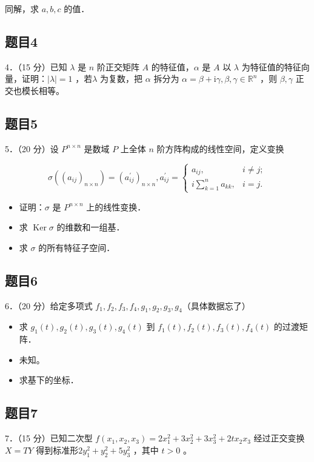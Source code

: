 \documentclass{article}
\begin{document}
同解，求 \(a, b, c\) 的值．

\subsection{题目4}
4．（15 分）已知 \(\lambda\) 是 \(n\) 阶正交矩阵 \(A\) 的特征值，\(\alpha\) 是 \(A\) 以 \(\lambda\) 为特征值的特征向量，证明：\(|\lambda|=1\) ，若\(\lambda\) 为复数，把 \(\alpha\) 拆分为 \(\alpha=\beta+\mathrm{i} \gamma, \beta, \gamma \in \mathbb{R}^{n}\) ，则 \(\beta, \gamma\) 正交也模长相等。

\subsection{题目5}
5．（20 分）设 \(P^{n \times n}\) 是数域 \(P\) 上全体 \(n\) 阶方阵构成的线性空间，定义变换

\[
\sigma\left(\left(a_{i j}\right)_{n \times n}\right)=\left(a_{i j}^{\prime}\right)_{n \times n}, a_{i j}^{\prime}= \begin{cases}a_{i j}, & i \neq j ; \\ i \sum_{k=1}^{n} a_{k k}, & i=j .\end{cases}
\]

\begin{itemize}
  \item[（1）] 证明：\(\sigma\) 是 \(P^{n \times n}\) 上的线性变换．
  \item[（2）] 求 \(\operatorname{Ker} \sigma\) 的维数和一组基．
  \item[（3）] 求 \(\sigma\) 的所有特征子空间．
\end{itemize}

\subsection{题目6}
6．（20 分）给定多项式 \(f_{1}, f_{2}, f_{3}, f_{4}, g_{1}, g_{2}, g_{3}, g_{4}\)（具体数据忘了）

\begin{itemize}
  \item[（1）] 求 \(g_{1}(t), g_{2}(t), g_{3}(t), g_{4}(t)\) 到 \(f_{1}(t), f_{2}(t), f_{3}(t), f_{4}(t)\) 的过渡矩阵．
  \item[（2）] 未知。
  \item[（3）] 求基下的坐标．
\end{itemize}

\subsection{题目7}
7．（15 分）已知二次型 \(f\left(x_{1}, x_{2}, x_{3}\right)=2 x_{1}^{2}+3 x_{2}^{2}+3 x_{3}^{2}+2 t x_{2} x_{3}\) 经过正交变换 \(X=T Y\) 得到标准形\(2 y_{1}^{2}+y_{2}^{2}+5 y_{3}^{2}\) ，其中 \(t>0\) 。
\end{document}
